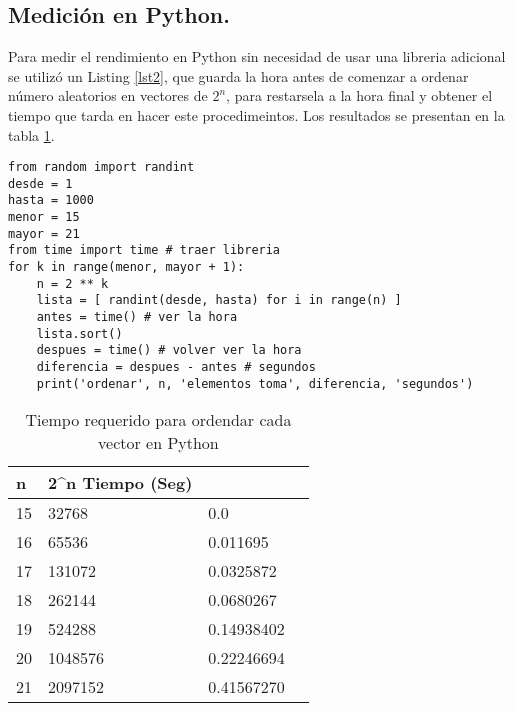 \documentclass{article}
\begin{document}
\subsection{Medición en Python.} 
Para medir el rendimiento en Python sin necesidad de usar una libreria adicional se utilizó un Listing \ref{lst2}, que guarda la hora antes de comenzar a ordenar número aleatorios en vectores de $2^n$, para restarsela a la hora final y obtener el tiempo que tarda en hacer este procedimeintos. Los resultados se presentan en la tabla \ref{tabla 2}.
\lstset{language=Python}
\lstset{frame=lines}
\lstset{basicstyle=\footnotesize}
\begin{lstlisting}
from random import randint
desde = 1
hasta = 1000
menor = 15
mayor = 21
from time import time # traer libreria
for k in range(menor, mayor + 1):
    n = 2 ** k
    lista = [ randint(desde, hasta) for i in range(n) ]
    antes = time() # ver la hora
    lista.sort()
    despues = time() # volver ver la hora
    diferencia = despues - antes # segundos
    print('ordenar', n, 'elementos toma', diferencia, 'segundos')
\end{lstlisting}
\begin{table}[h]
\centering
\begin{tabular}{|l|l|l|l|}
\hline
n  & 2\textasciicircum{}n Tiempo (Seg) \\ \hline
15  & 32768                    & 0.0                            \\ \hline
16  & 65536                    & 0.011695                            \\ \hline
17  & 131072                   & 0.0325872                          \\ \hline
18  & 262144                   & 0.0680267                              \\ \hline
19  & 524288                   & 0.14938402                              \\ \hline
20  & 1048576                  & 0.22246694                             \\ \hline
21  & 2097152                  & 0.41567270                             \\ \hline
\end{tabular}
\caption{Tiempo requerido para ordendar cada vector en Python}
\label{tabla 2}
\end{table}
\end{document}

